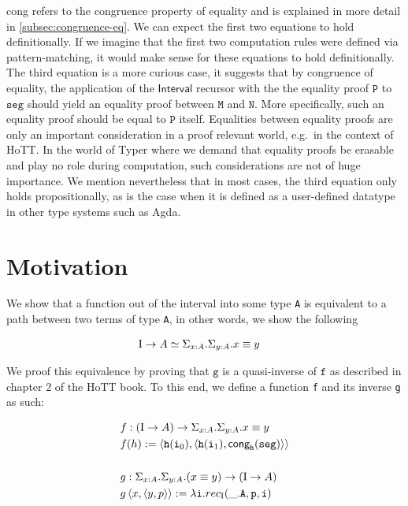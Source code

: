 \documentclass[12pt,twoside,maitrise]{dms}
\theoremstyle{definition}
\numberwithin{equation}{section}
\numberwithin{table}{chapter}
\numberwithin{figure}{chapter}
\newcommand\kw[1] {\textsf{#1}}
\newcommand\id[1] {\texttt{#1}}
\newcommand\fn[1] {\texttt{#1}}
\begin{document}
\kw{cong} refers to the congruence property of equality and is explained in more
detail in \autoref{subsec:congruence-eq}. We can expect the first two equations
to hold definitionally. If we imagine that the first two computation rules were
defined via pattern-matching, it would make sense for these equations to hold
definitionally. The third equation is a more curious case, it suggests that by
congruence of equality, the application of the $\kw{Interval}$ recursor with the
the equality proof $\id{P}$ to $\id{seg}$ should yield an equality proof between
$\id{M}$ and $\id{N}$. More specifically, such an equality proof should be equal
to $\id{P}$ itself. Equalities between equality proofs are only an important
consideration in a proof relevant world, e.g.\ in the context of HoTT. In the
world of Typer where we demand that equality proofs be erasable and play no role
during computation, such considerations are not of huge importance. We mention
nevertheless that in most cases, the third equation only holds propositionally,
as is the case when it is defined as a user-defined datatype in other type
systems such as Agda.

\section{Motivation}
We show that a function out of the interval into some type \id{A} is equivalent to a path between two terms of type \id{A}, in other words, we show the following

\begin{align*}
  & \bI \rightarrow A \simeq \Sigma_{\oftype{x}{A}} . \Sigma_{\oftype{y}{A}} . \eqtype{x}{y}
\end{align*}

We proof this equivalence by proving that $\fn{g}$ is a quasi-inverse of
$\fn{f}$ as described in chapter 2 of the HoTT book\cite{HoTTbook}. To this end,
we define a function \id{f} and its inverse \id{g} as such:


\begin{align*}
  & f : (\bI \rightarrow A) \rightarrow \Sigma_{\oftype{x}{A}} . \Sigma_{\oftype{y}{A}} . \eqtype{x}{y} \\
  & f(h) := \braket{\id{h}(\ileft), \braket{\id{h}(\iright), \kw{cong}_{\id{h}}(\id{seg})}} \\ \\
  & g : \Sigma_{\oftype{x}{A}} . \Sigma_{\oftype{y}{A}} . (\eqtype{x}{y}) \rightarrow  (\bI \rightarrow A) \\
  & g \braket{x, \braket{y, p}} := \lambda \id{i} . rec_{\bI}(\_ . \id{A}, \id{p}, \id{i})
\end{align*}
\end{document}
